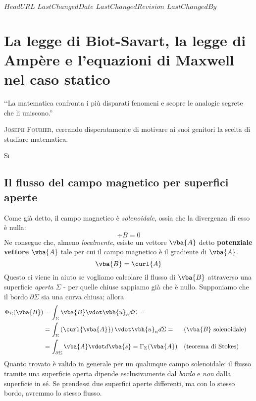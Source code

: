 \svnidlong
{$HeadURL$}
{$LastChangedDate$}
{$LastChangedRevision$}
{$LastChangedBy$}

\chapter{La legge di Biot-Savart, la legge di Ampère e l'equazioni di Maxwell nel caso statico}

\begin{introduction}
	‘‘La matematica confronta i più disparati fenomeni e scopre le analogie segrete che li uniscono.''
	\begin{flushright}
		\textsc{Joseph Fourier,} cercando disperatamente di motivare ai suoi genitori la scelta di studiare matematica. %
	\end{flushright}
\end{introduction}
\lettrine[findent=1pt, nindent=0pt]{S}{i} %

\section{Il flusso del campo magnetico per superfici aperte}
Come già detto, il campo magnetico è \textit{solenoidale}, ossia che la divergenza di esso è nulla:
\begin{equation*}
	\div{B}=0
\end{equation*}
Ne consegue che, almeno \textit{localmente}, esiste un vettore $\vba{A}$ detto \textbf{potenziale vettore} $\vba{A}$ tale per cui il campo magnetico è il gradiente di $\vba{A}$.
\begin{equation}
	\vba{B}=\curl{A}
\end{equation}
Questo ci viene in aiuto se vogliamo calcolare il flusso di $\vba{B}$ attraverso una superficie \textit{aperta} $\Sigma$ - per quelle chiuse sappiamo già che è nullo. Supponiamo che il bordo $\partial \Sigma$ sia una curva chiusa; allora
\begin{align*}
	\Phi_{\Sigma}(\vba{B})&=\int_{\Sigma}\vba{B}\vdot\vbh{u}_nd\Sigma=\\
	&=\int_{\Sigma}\left(\curl{\vba{A}}\right)\vdot\vbh{u}_nd\Sigma=&&\text{(}\vba{B}\ \text{solenoidale)}\\
	&=\int_{\partial \Sigma}\vba{A}\vdot d\vba{s}=\Gamma_{\Sigma}(\vba{A})&&\text{(teorema di Stokes)}
\end{align*}
Quanto trovato è valido in generale per un qualunque campo solenoidale: il flusso tramite una superficie aperta dipende esclusivamente dal \textit{bordo} e \textit{non} dalla superficie in sé. Se prendessi due superfici aperte differenti, ma con lo stesso bordo, avremmo lo stesso flusso.

